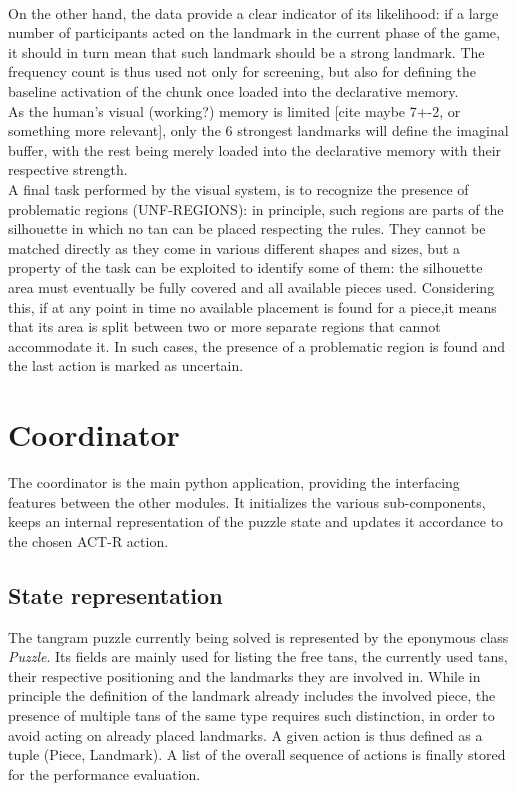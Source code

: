 \documentclass[a4paper,singleside,12pt]{report} %
\begin{document}
    \\On the other hand, the data provide a clear indicator of its likelihood: if a large number of participants acted on the landmark in the current phase of the game, it should in turn mean that such landmark should be a strong landmark. The frequency count is thus used not only for screening, but also for defining the baseline activation of the chunk once loaded into the declarative memory.\\
    As the human's visual (working?) memory is limited [cite maybe 7+-2, or something more relevant], only the 6 strongest landmarks will define the imaginal buffer, with the rest being merely loaded into the declarative memory with their respective strength.\\
    A final task performed by the visual system, is to recognize the presence of problematic regions (UNF-REGIONS): in principle, such regions are parts of the silhouette in which no tan can be placed respecting the rules. They cannot be matched directly as they come in various different shapes and sizes, but a property of the task can be exploited to identify some of them: the silhouette area must eventually be fully covered and all available pieces used. Considering this, if at any point in time no available placement is found for a piece,it means that its area is split between two or more separate regions that cannot accommodate it. In such cases, the presence of a problematic region is found and the last action is marked as uncertain.
    
    \section{Coordinator}
    The coordinator is the main python application, providing the interfacing features between the other modules. It initializes the various sub-components, keeps an internal representation of the puzzle state and updates it accordance to the chosen ACT-R action.
    \subsection{State representation}
    The tangram puzzle currently being solved is represented by the eponymous class \textit{Puzzle}. Its fields are mainly used for listing the free tans, the currently used tans, their respective positioning and the landmarks they are involved in. While in principle the definition of the landmark already includes the involved piece, the presence of multiple tans of the same type requires such distinction, in order to avoid acting on already placed landmarks. A given action is thus defined as a tuple (Piece, Landmark). A list of the overall sequence of actions is finally stored for the performance evaluation.
\end{document}
